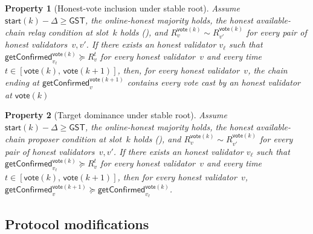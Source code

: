 \ifx\litemode\undefined\documentclass{article}\fi
\newcommand{\start}{\mathsf{start}}
\newcommand{\vote}{\mathsf{vote}}
\newcommand{\getConfirmed}{\textsf{getConfirmed}\xspace}
\theoremstyle{plain}
\newtheorem{property}{Property}
\theoremstyle{definition}
\theoremstyle{remark}
\newcommand{\GST}{\ensuremath{\mathsf{GST}}}
\newcommand{\OHM}{online-honest majority\xspace}
\newcommand{\HAP}{honest available-chain proposer\xspace}
\newcommand{\HAR}{honest available-chain relay\xspace}
\begin{document}
\begin{property}[Honest-vote inclusion under stable root]\label{rev:prop:honest-vote-inclusion}
Assume $\start(k) - \Delta \geq \GST$, the \OHM holds, the \HAR condition at slot~$k$ holds (), and $R_v^{\vote(k)} \sim R_{v'}^{\vote(k)}$ for every pair of honest validators~$v, v'$.
If there exists an honest validator $v_\ell$ such that
$\getConfirmed_{v_\ell}^{\vote(k)}\succeq R_{v}^t$ for every honest validator~$v$ and every time $t \in [\vote(k),\, \vote(k+1)]$, then,
for every honest validator~$v$, the chain ending at $\getConfirmed_v^{\vote(k+1)}$ contains every vote cast by an honest validator at $\vote(k)$
\end{property}


\begin{property}[Target dominance under stable root]\label{rev:prop:target-dominance}
Assume $\start(k) - \Delta \geq \GST$, the \OHM holds, the \HAP condition at slot~$k$ holds (), and $R_v^{\vote(k)} \sim R_{v'}^{\vote(k)}$ for every pair of honest validators~$v, v'$.
If there exists an honest validator $v_\ell$ such that $\getConfirmed_{v_\ell}^{\vote(k)} \succeq R_{v}^t$ for every honest validator~$v$ and every time $t \in [\vote(k),\, \vote(k+1)]$, then for every honest validator~$v$, $\getConfirmed_v^{\vote(k+1)} \succeq \getConfirmed_{v_\ell}^{\vote(k)}$.
\end{property}

\subsection{Protocol modifications}\label{rev:sec:healing-protocol}
\end{document}
